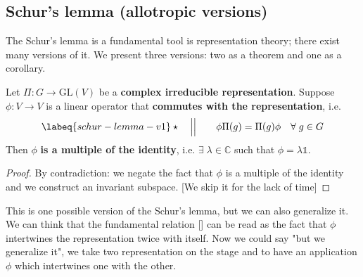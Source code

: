 \documentclass[../main.tex]{subfiles}
\begin{document}
\subsection{Schur's lemma (allotropic versions)}
The Schur's lemma is a fundamental tool is representation theory; there exist many versions of it. We present three versions: two as a theorem and one as a corollary.
\begin{theorem}[Schur]
Let $\Pi:G\to\textrm{GL}(V)$ be a \textbf{complex irreducible representation}. Suppose $\phi:V\to V$ is a linear operator that \textbf{commutes with the representation}, i.e.
\begin{equation}\labeq{schur-lemma-v1}
\star \quad \Big|\Big|\qquad \phi\Pi(g)=\Pi(g)\phi \quad \forall\;g\in G
\end{equation}
Then $\phi$ \textbf{is a multiple of the identity}, i.e. $\exists\;\lambda\in\mathbb{C}$ such that $\phi=\lambda\mathbb{1}$.
\end{theorem}
\begin{proof}
By contradiction: we negate the fact that $\phi$ is a multiple of the identity and we construct an invariant subspace. [We skip it for the lack of time]
\end{proof}
This is one possible version of the Schur's lemma, but we can also generalize it. We can think that the fundamental relation [] can be read as the fact that $\phi$ intertwines the representation twice with itself. Now we could say "but we generalize it", we take two representation on the stage and to have an application $\phi$ which intertwines one with the other.
\end{document}
